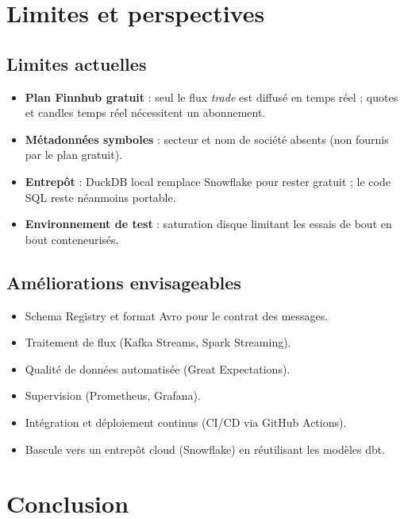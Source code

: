 \documentclass[11pt,a4paper]{article}
\begin{document}
\section{Limites et perspectives}

\subsection{Limites actuelles}

\begin{itemize}
  \item \textbf{Plan Finnhub gratuit} : seul le flux \emph{trade} est diffusé en
        temps réel ; quotes et candles temps réel nécessitent un abonnement.
  \item \textbf{Métadonnées symboles} : secteur et nom de société absents (non
        fournis par le plan gratuit).
  \item \textbf{Entrepôt} : DuckDB local remplace Snowflake pour rester gratuit ;
        le code SQL reste néanmoins portable.
  \item \textbf{Environnement de test} : saturation disque limitant les essais
        de bout en bout conteneurisés.
\end{itemize}

\subsection{Améliorations envisageables}

\begin{itemize}
  \item Schema Registry et format Avro pour le contrat des messages.
  \item Traitement de flux (Kafka Streams, Spark Streaming).
  \item Qualité de données automatisée (Great Expectations).
  \item Supervision (Prometheus, Grafana).
  \item Intégration et déploiement continus (CI/CD via GitHub Actions).
  \item Bascule vers un entrepôt cloud (Snowflake) en réutilisant les modèles dbt.
\end{itemize}

\section{Conclusion}
\end{document}
